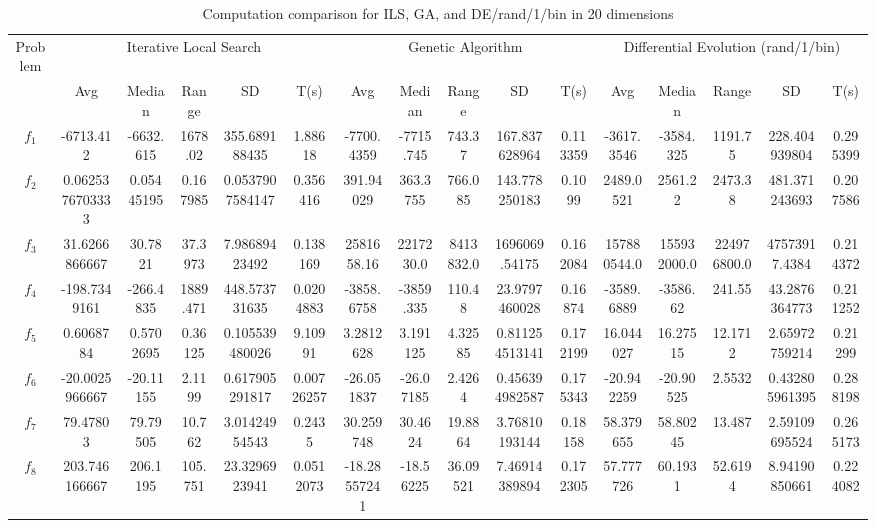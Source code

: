 \documentclass[paper=a4, fontsize=11pt]{scrartcl} %
\numberwithin{equation}{section} %
\numberwithin{figure}{section} %
\numberwithin{table}{section} %
\begin{document}
\begin{landscape}
	\begin{table}
		\tiny
		\centering
		\caption{Computation comparison for ILS, GA, and DE/rand/1/bin in 20 dimensions}
		\label{Tab1d}
		\begin{tabular}{c|ccccc|ccccc|ccccc}
			\noalign{\smallskip}\hline\noalign{\smallskip}
			Problem & \multicolumn{5}{c}{Iterative Local Search}& \multicolumn{5}{|c|}{Genetic Algorithm}
			&  \multicolumn{5}{c}{Differential Evolution (rand/1/bin)} \\ 
			\noalign{\smallskip}\hline\noalign{\smallskip}
			& Avg & Median & Range & SD & T(s) & Avg & Median
			& Range & SD & T(s) & Avg & Median & Range & SD &
			T(s) \\ 
			\noalign{\smallskip}\hline\noalign{\smallskip}
			$f_{1}$ & -6713.412 & -6632.615 & 1678.02 & 355.689188435 & 1.88618 & -7700.4359 & -7715.745 & 743.37 & 167.837628964 & 0.113359 & -3617.3546 & -3584.325 & 1191.75 & 228.404939804 & 0.295399\\
			$f_{2}$ & 0.0625376703333 & 0.05445195 & 0.167985 & 0.0537907584147 & 0.356416 & 391.94029 & 363.3755 & 766.085 & 143.778250183 & 0.1099 & 2489.0521 & 2561.22 & 2473.38 & 481.371243693 & 0.207586\\
			$f_{3}$ & 31.6266866667 & 30.7821 & 37.3973 & 7.98689423492 & 0.138169 & 2581658.16 & 2217230.0 & 8413832.0 & 1696069.54175 & 0.162084 & 157880544.0 & 155932000.0 & 224976800.0 & 47573917.4384 & 0.214372\\
			$f_{4}$ & -198.7349161 & -266.4835 & 1889.471 & 448.573731635 & 0.0204883 & -3858.6758 & -3859.335 & 110.48 & 23.9797460028 & 0.16874 & -3589.6889 & -3586.62 & 241.55 & 43.2876364773 & 0.211252\\
			$f_{5}$ & 0.6068784 & 0.5702695 & 0.36125 & 0.105539480026 & 9.10991 & 3.2812628 & 3.191125 & 4.32585 & 0.811254513141 & 0.172199 & 16.044027 & 16.27515 & 12.1712 & 2.65972759214 & 0.21299\\
			$f_{6}$ & -20.0025966667 & -20.11155 & 2.1199 & 0.617905291817 & 0.00726257 & -26.051837 & -26.07185 & 2.4264 & 0.456394982587 & 0.175343 & -20.942259 & -20.90525 & 2.5532 & 0.432805961395 & 0.288198\\
			$f_{7}$ & 79.47803 & 79.79505 & 10.762 & 3.01424954543 & 0.2435 & 30.259748 & 30.4624 & 19.8864 & 3.76810193144 & 0.18158 & 58.379655 & 58.80245 & 13.487 & 2.59109695524 & 0.265173\\
			$f_{8}$ & 203.746166667 & 206.1195 & 105.751 & 23.3296923941 & 0.0512073 & -18.28557241 & -18.56225 & 36.09521 & 7.46914389894 & 0.172305 & 57.777726 & 60.1931 & 52.6194 & 8.94190850661 & 0.224082\\

\end{tabular}
\end{table}
\end{landscape}
\end{document}
